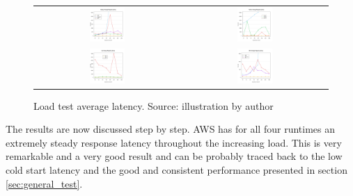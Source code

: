 \begin{figure}[!t]
\begin{center}
\begin{tabular}{c c}
\includegraphics[width=0.25\textwidth]{bilder/loadtest_average_latency/plot_average_latency_node.pdf} & \includegraphics[width=0.25\textwidth]{bilder/loadtest_average_latency/plot_average_latency_python.pdf} \\
\includegraphics[width=0.25\textwidth]{bilder/loadtest_average_latency/plot_average_latency_go.pdf} & \includegraphics[width=0.25\textwidth]{bilder/loadtest_average_latency/plot_average_latency_dotnet.pdf} \\
\end{tabular}
\captionsetup{justification=centering, labelfont=bf}
\caption[Load test average latency]{Load test average latency. Source: illustration by author}
\label{fig:load_test_latency_all}
\end{center}
\end{figure}
The results are now discussed step by step. \gls{AWS} has for all four runtimes an extremely steady response latency throughout the increasing load. This is very remarkable and a very good result and can be probably traced back to the low cold start latency and the good and consistent performance presented in section \ref{sec:general_test}.\\
